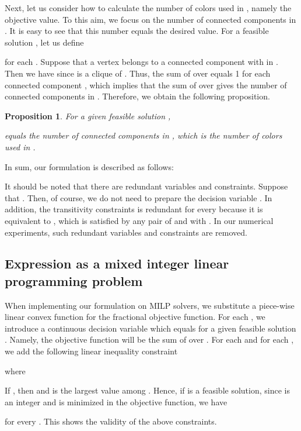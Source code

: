 \documentclass[11pt,a4paper]{article}
\newtheorem{prop}[thm]{Proposition}
\begin{document}
\par

Next, let us consider how to calculate the number of colors used in , namely the objective value. 
To this aim, we focus on the number of connected components in . 
It is easy to see that this number equals the desired value. 
For a feasible solution , let us define

for each . 
Suppose that a vertex  belongs to a connected component  with  in . 
Then we have  since  is a clique of . 
Thus, the sum of  over  equals 1 for each connected component , 
which implies that the sum of  over  gives the number of connected components in . 
Therefore, we obtain the following proposition. 

\begin{prop}
For a given feasible solution , 

equals the number of connected components in , which is the number of colors used in . 
\end{prop}

In sum, our formulation is described as follows: 

It should be noted that there are redundant variables and constraints. 
Suppose that . 
Then, of course, we do not need to prepare the decision variable . 
In addition, the transitivity constraints 
 is redundant for every  
because it is equivalent to , 
which is satisfied by any pair of  and  with . 
In our numerical experiments, such redundant variables and constraints are removed. 

\subsection{Expression as a mixed integer linear programming problem}

When implementing our formulation on MILP solvers, 
we substitute a piece-wise linear convex function for 
the fractional objective function. 
For each , 
we introduce a continuous decision variable  which equals  for a given feasible solution . 
Namely, the objective function will be the sum of  over . 
For each  and for each , 
we add the following linear inequality constraint 

where 


If , then 
 and  is the largest value among . 
Hence, if  is a feasible solution, since  is an integer 
and  is minimized in the objective function, we have 

for every . 
This shows the validity of the above constraints. 
\end{document}
